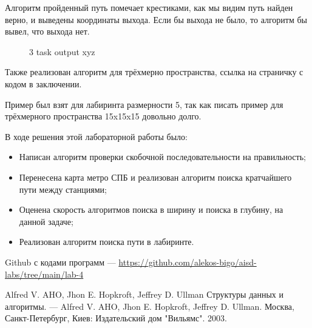 \documentclass[14pt]{extreport}
\begin{document}
 Алгоритм пройденный путь помечает крестиками, как мы видим путь найден верно, и выведены координаты выхода. Если бы выхода не было, то алгоритм бы вывел, что выхода нет.

\newpage

\begin{figure}[H]
\caption{3 task output xyz}
\label{grf2}
\end{figure}

Также реализован алгоритм для трёхмерно пространства, ссылка на страничку с кодом в заключении.

Пример был взят для лабиринта размерности 5, так как писать пример для трёхмерного пространства 15x15x15 довольно долго.

\newpage
{}
\conclusions

В ходе решения этой лабораторной работы было:
\begin{itemize}
    \item Написан алгоритм проверки скобочной последовательности на правильность;
    \item Перенесена карта метро СПБ и реализован алгоритм поиска кратчайшего пути между станциями;
    \item Оценена скорость алгоритмов поиска в ширину и поиска в глубину, на данной задаче;
    \item Реализован алгоритм поиска пути в лабиринте.
\end{itemize}

Github с кодами программ --- \url{https://github.com/alekos-bigo/aisd-labs/tree/main/lab-4}

\newpage
\begin{thebibliography}{99}

 Alfred V. AHO, Jhon E. Hopkroft, Jeffrey D. Ullman Структуры данных и алгоритмы. --- Alfred V. AHO, Jhon E. Hopkroft, Jeffrey D. Ullman. Москва, Санкт-Петербург, Киев: Издательский дом "Вильямс". 2003.

\end{thebibliography}
\end{document}
